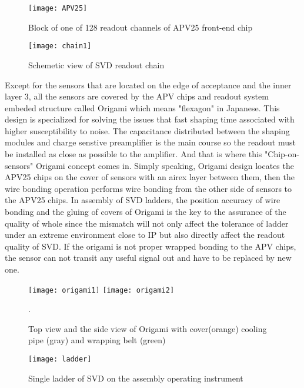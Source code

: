 	\begin{figure}[htbp]
		\centering
		\texttt{[image: APV25]}
		\caption{Block of one of 128 readout channels of APV25 front-end chip}
		
	\end{figure}


\begin{figure}[htbp]
	\centering
	\texttt{[image: chain1]}
	\caption{Schemetic view of SVD readout chain }
\end{figure}


	Except for the sensors that are located on the edge of acceptance and the inner layer 3, all the sensors are covered by the APV chips and readout system embeded structure called Origami which means "flexagon" in Japanese. This design is specialized for solving the issues that fast shaping time associated with higher susceptibility to noise. The capacitance distributed between the shaping modules and charge senstive preamplifier is the main course so the readout must be installed as close as possible to the amplifier. And that is where this "Chip-on-sensors" Origami concept comes in. Simply speaking, Origami design locates the APV25 chips on the cover of sensors with an airex layer between them, then the wire bonding operation performs wire bonding from the other side of sensors to the APV25 chips. In assembly of SVD ladders, the position accuracy of wire bonding and the gluing of covers of Origami is the key to the assurance of the quality of whole since the mismatch will not only affect the tolerance of ladder under an extreme environment close to IP but also directly affect the readout quality of SVD. If the origami is not proper wrapped bonding to the APV chips, the sensor can not transit any useful signal out and have to be replaced by new one.
	
	\begin{figure}[htbp]
		\centering
		\texttt{[image: origami1]}
		\texttt{[image: origami2]}
		\caption{Top view and the side view of Origami with cover(orange) cooling pipe (gray) and wrapping belt (green)}. 
	\end{figure}

\begin{figure}[htbp]
	\centering
	\texttt{[image: ladder]}
	\caption{Single ladder of SVD on the assembly operating instrument  }
\end{figure}


